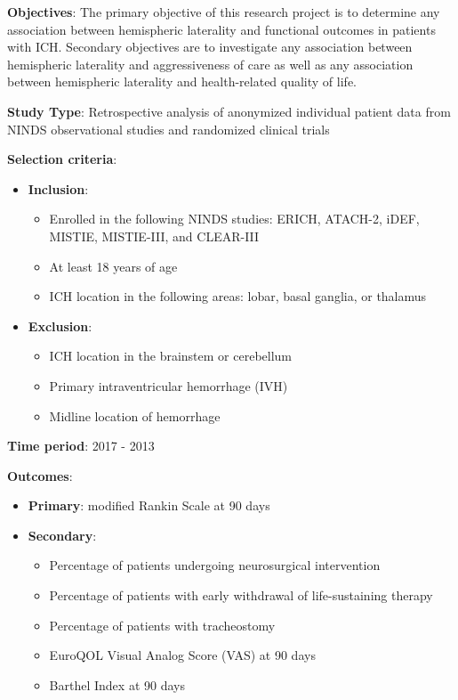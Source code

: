 \documentclass[
  letterpaper,
  DIV=11,
  numbers=noendperiod]{scrartcl}
\providecommand{\tightlist}{%
  \setlength{\itemsep}{0pt}\setlength{\parskip}{0pt}}\usepackage{longtable,booktabs,array}
\begin{document}
\textbf{Objectives}: The primary objective of this research project is
to determine any association between hemispheric laterality and
functional outcomes in patients with ICH. Secondary objectives are to
investigate any association between hemispheric laterality and
aggressiveness of care as well as any association between hemispheric
laterality and health-related quality of life.

\textbf{Study Type}: Retrospective analysis of anonymized individual
patient data from NINDS observational studies and randomized clinical
trials

\textbf{Selection criteria}:

\begin{itemize}
\item
  \textbf{Inclusion}:

  \begin{itemize}
  \tightlist
  \item
    Enrolled in the following NINDS studies: ERICH, ATACH-2, iDEF,
    MISTIE, MISTIE-III, and CLEAR-III
  \item
    At least 18 years of age
  \item
    ICH location in the following areas: lobar, basal ganglia, or
    thalamus
  \end{itemize}
\item
  \textbf{Exclusion}:

  \begin{itemize}
  \tightlist
  \item
    ICH location in the brainstem or cerebellum
  \item
    Primary intraventricular hemorrhage (IVH)
  \item
    Midline location of hemorrhage
  \end{itemize}
\end{itemize}

\textbf{Time period}: 2017 - 2013

\textbf{Outcomes}:

\begin{itemize}
\tightlist
\item
  \textbf{Primary}: modified Rankin Scale at 90 days
\item
  \textbf{Secondary}:

  \begin{itemize}
  \tightlist
  \item
    Percentage of patients undergoing neurosurgical intervention
  \item
    Percentage of patients with early withdrawal of life-sustaining
    therapy
  \item
    Percentage of patients with tracheostomy
  \item
    EuroQOL Visual Analog Score (VAS) at 90 days
  \item
    Barthel Index at 90 days
  \end{itemize}
\end{itemize}
\end{document}
